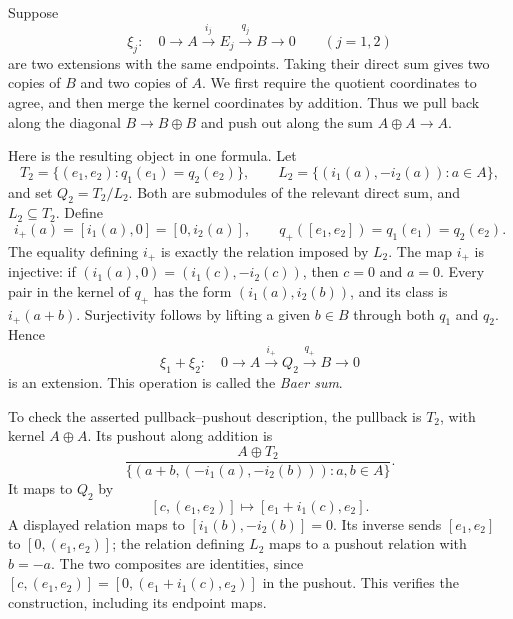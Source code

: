 \documentclass[11pt]{article}
\theoremstyle{definition}
\theoremstyle{remark}\newtheorem{remark}[theorem]{Remark}
\begin{document}
Suppose
\[
\xi_j:\quad 0\longrightarrow A\xrightarrow{i_j}E_j
 \xrightarrow{q_j}B\longrightarrow0
\qquad (j=1,2)
\]
are two extensions with the same endpoints. Taking their direct sum gives
two copies of $B$ and two copies of $A$. We first require the quotient
coordinates to agree, and then merge the kernel coordinates by addition.
Thus we pull back along the diagonal $B\to B\oplus B$ and push out along
the sum $A\oplus A\to A$.

Here is the resulting object in one formula. Let
\[
T_2=\{(e_1,e_2):q_1(e_1)=q_2(e_2)\},\qquad
L_2=\{(i_1(a),-i_2(a)):a\in A\},
\]
and set $Q_2=T_2/L_2$. Both are submodules of the relevant direct sum,
and $L_2\subseteq T_2$. Define
\[
i_+(a)=[i_1(a),0]=[0,i_2(a)],\qquad
q_+([e_1,e_2])=q_1(e_1)=q_2(e_2).
\]
The equality defining $i_+$ is exactly the relation imposed by $L_2$.
The map $i_+$ is injective: if $(i_1(a),0)=(i_1(c),-i_2(c))$, then
$c=0$ and $a=0$. Every pair in the kernel of $q_+$ has the form
$(i_1(a),i_2(b))$, and its class is $i_+(a+b)$. Surjectivity follows by
lifting a given $b\in B$ through both $q_1$ and $q_2$. Hence
\[
\xi_1+\xi_2:\quad
0\longrightarrow A\xrightarrow{i_+}Q_2\xrightarrow{q_+}B
\longrightarrow0
\]
is an extension. This operation is called the \emph{Baer sum}.

To check the asserted pullback--pushout description, the pullback is
$T_2$, with kernel $A\oplus A$. Its pushout along addition is
\[
\frac{A\oplus T_2}
 {\{(a+b,(-i_1(a),-i_2(b))):a,b\in A\}}.
\]
It maps to $Q_2$ by
\[
[c,(e_1,e_2)]\longmapsto[e_1+i_1(c),e_2].
\]
A displayed relation maps to $[i_1(b),-i_2(b)]=0$. Its inverse sends
$[e_1,e_2]$ to $[0,(e_1,e_2)]$; the relation defining $L_2$ maps to a
pushout relation with $b=-a$. The two composites are identities, since
$[c,(e_1,e_2)]=[0,(e_1+i_1(c),e_2)]$ in the pushout. This verifies the
construction, including its endpoint maps.
\end{document}
